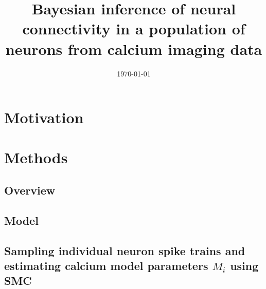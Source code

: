 \documentclass[amsmath, amssymb]{revtex4}
\begin{document}

\date{\today}

\title{Bayesian inference of neural connectivity in a population of neurons from 
calcium imaging data}


\begin{abstract}

\end{abstract}

\maketitle
\tableofcontents

\section{Motivation}
\label{sec1}


\section{Methods}
\label{sec:methods}

\subsection{Overview}
\label{sec:methods:introduction}


\subsection{Model} %
\label{sec:methods:markov-setup}


\subsection{Sampling individual neuron spike trains and estimating calcium model parameters $M_i$ using SMC}
\label{sec:methods:sampling_neuron}

\end{document}

